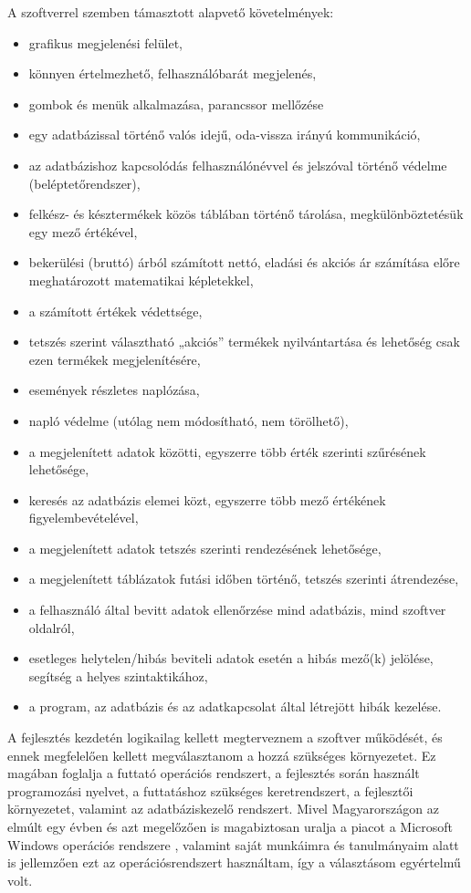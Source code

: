 
A szoftverrel szemben támasztott alapvető követelmények:
\begin{itemize}
\item grafikus megjelenési felület,
\item könnyen értelmezhető, felhasználóbarát megjelenés,
\item gombok és menük alkalmazása, parancssor mellőzése
\item egy adatbázissal történő valós idejű, oda-vissza irányú kommunikáció,
\item az adatbázishoz kapcsolódás felhasználónévvel és jelszóval történő védelme (beléptetőrendszer),
\item felkész- és késztermékek közös táblában történő tárolása, megkülönböztetésük egy mező értékével,
\item bekerülési (bruttó) árból számított nettó, eladási és akciós ár számítása előre meghatározott matematikai képletekkel,
\item a számított értékek védettsége,
\item tetszés szerint választható „akciós” termékek nyilvántartása és lehetőség csak ezen termékek megjelenítésére,
\item események részletes naplózása,
\item napló védelme (utólag nem módosítható, nem törölhető),
\item a megjelenített adatok közötti, egyszerre több érték szerinti szűrésének lehetősége,
\item keresés az adatbázis elemei közt, egyszerre több mező értékének figyelembevételével,
\item a megjelenített adatok tetszés szerinti rendezésének lehetősége,
\item a megjelenített táblázatok futási időben történő, tetszés szerinti átrendezése,
\item a felhasználó által bevitt adatok ellenőrzése mind adatbázis, mind szoftver oldalról,
\item esetleges helytelen/hibás beviteli adatok esetén a hibás mező(k) jelölése, segítség a helyes szintaktikához,
\item a program, az adatbázis és az adatkapcsolat által létrejött hibák kezelése.
\end{itemize}
\newpage

A fejlesztés kezdetén logikailag kellett megterveznem a szoftver működését, és ennek megfelelően kellett megválasztanom a hozzá szükséges környezetet. Ez magában foglalja a futtató operációs rendszert, a fejlesztés során használt programozási nyelvet, a futtatáshoz szükséges keretrendszert, a fejlesztői környezetet, valamint az adatbáziskezelő rendszert. Mivel Magyarországon az elmúlt egy évben és azt megelőzően is magabiztosan uralja a piacot a Microsoft Windows operációs rendszere \cite{statcounter_os_market_share}, valamint saját munkáimra és tanulmányaim alatt is jellemzően ezt az operációsrendszert használtam, így a választásom egyértelmű volt.

